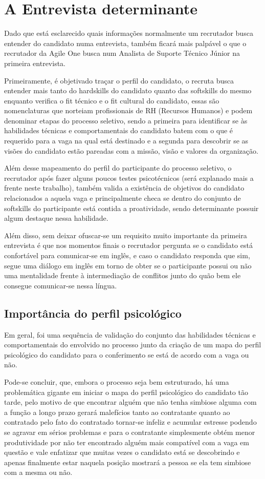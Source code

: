 \documentclass[12pt]{article}
\begin{document}
\section{A Entrevista determinante}

Dado que está esclarecido quais informações normalmente um recrutador busca entender do candidato numa entrevista, também ficará mais palpável o que o recrutador da Agile One busca num Analista de Suporte Técnico Júnior na primeira entrevista.

Primeiramente, é objetivado traçar o perfil do candidato, o recruta busca entender mais tanto do hardskills do candidato quanto das softskills do mesmo enquanto verifica o fit técnico e o fit cultural do candidato, essas são nomenclaturas que norteiam profissionais de RH (Recursos Humanos) e podem denominar etapas do processo seletivo, sendo a primeira para identificar se às habilidades técnicas e comportamentais do candidato batem com o que é requerido para a vaga na qual está destinado e a segunda para descobrir se as visões do candidato estão pareadas com a missão, visão e valores da organização.

Além desse mapeamento do perfil do participante do processo seletivo, o recrutador após fazer alguns poucos testes psicotécnicos (será explanado mais a frente neste trabalho), também valida a existência de objetivos do candidato relacionados a aquela vaga e principalmente checa se dentro do conjunto de softskills do participante está contida a proatividade, sendo determinante possuir algum destaque nessa habilidade.

Além disso, sem deixar ofuscar-se um requisito muito importante da primeira entrevista é que nos momentos finais o recrutador pergunta se o candidato está confortável para comunicar-se em inglês, e caso o candidato responda que sim, segue uma diálogo em inglês em torno de obter se o participante possui ou não uma mentalidade frente à intermediação de conflitos junto do quão bem ele consegue comunicar-se nessa língua. 

\subsection{Importância do perfil psicológico}
Em geral, foi uma sequência de validação do conjunto das habilidades técnicas e comportamentais do envolvido no processo junto da criação de um mapa do perfil psicológico do candidato para o conferimento se está de acordo com a vaga ou não.

Pode-se concluir, que, embora o processo seja bem estruturado, há uma problemática gigante em iniciar o mapa do perfil psicológico do candidato tão tarde, pelo motivo de que encontrar alguém que não tenha simbiose alguma com a função a longo prazo gerará malefícios tanto ao contratante quanto ao contratado pelo fato do contratado tornar-se infeliz e acumular estresse podendo se agravar em sérios problemas e para o contratante simplesmente obtém menor produtividade por não ter encontrado alguém mais compatível com a vaga em questão e vale enfatizar que muitas vezes o candidato está se descobrindo e apenas finalmente estar naquela posição mostrará a pessoa se ela tem simbiose com a mesma ou não.
\end{document}
